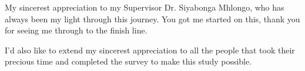 \documentclass[11pt]{report}
\begin{document}
My sincerest appreciation to my Supervisor Dr. Siyabonga Mhlongo, who has always been my light through this journey. You got me started on this, thank you for seeing me through to the finish line.

I’d also like to extend my sincerest appreciation to all the people that took their precious time and completed the survey to make this study possible.

\tableofcontents
{}
\clearpage

{} %
\printglossary[title=List of Acronyms,type=\acronymtype,style=long,nonumberlist,toctitle=List of Acronyms]
\clearpage

{} %
\listoffigures
\clearpage

\newpage
\setcounter{page}{0}
\glsresetall








{}
\renewcommand\bibname{References}
\printbibliography


	
\end{document}

